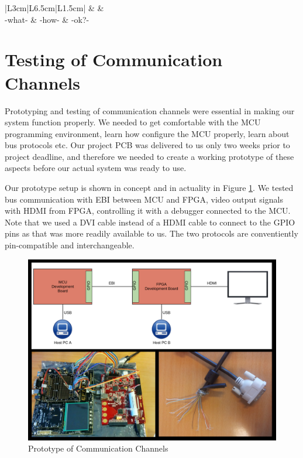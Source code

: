 \noindent\begin{tabular}{|L{3cm}|L{6.5cm}|L{1.5cm}|}
	 &
	 &
	 \\
\hline
	-what- &
	-how- &
	-ok?-\\
\hline
\end{tabular}



\section{Testing of Communication Channels}
Prototyping and testing of communication channels were essential in making our system function properly.
We needed to get comfortable with the MCU programming environment, learn how configure the MCU properly, learn about bus protocols etc.
Our project PCB was delivered to us only two weeks prior to project deadline, and therefore we needed to create a working prototype of these aspects before our actual system was ready to use.

Our prototype setup is shown in concept and in actuality in Figure \ref{prototype}.
We tested bus communication with EBI between MCU and FPGA, video output signals with HDMI from FPGA, controlling it with a debugger connected to the MCU.
Note that we used a DVI cable instead of a HDMI cable to connect to the GPIO pins as that was more readily available to us. The two protocols are conventiently pin-compatible and interchangeable.

\begin{figure}[htp]
\centering
\includegraphics[width=\textwidth]{diagrams/prototype_complete.png}
\caption{Prototype of Communication Channels}
\label{prototype}
\end{figure}

